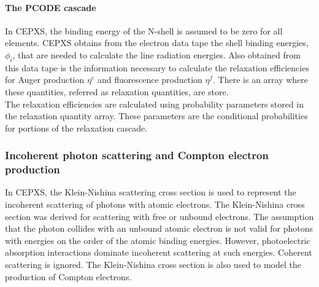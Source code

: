 \paragraph{The PCODE cascade}
In CEPXS, the binding energy of the N-shell is assumed to be zero for all
elements. CEPXS obtains from the electron data tape the shell binding
energies, $\phi_i$, that are needed to calculate the line radiation energies.
Also obtained from this data tape is the information necessary to calculate
the relaxation efficiencies for Auger production $\eta^e$ and fluorescence
production $\eta^f$. There is an array where these quantities, referred as
relaxation quantities, are store.\\
The relaxation efficiencies are calculated using probability parameters stored
in the relaxation quantity array. These parameters are the conditional
probabilities for portions of the relaxation cascade.

\subsubsection{Incoherent photon scattering and Compton electron production}
In CEPXS, the Klein-Nishina scattering cross section is used to represent the
incoherent scattering of photons with atomic electrons. The Klein-Nishina
cross  section was derived for scattering with free or unbound electrons. The
assumption that the photon collides with an unbound atomic electron is not valid for
photons with energies on the order of the atomic binding energies. However,
photoelectric absorption interactions dominate incoherent scattering at such
energies. Coherent scattering is ignored. The Klein-Nishina cross section is
also used to model the production of Compton electrons.

